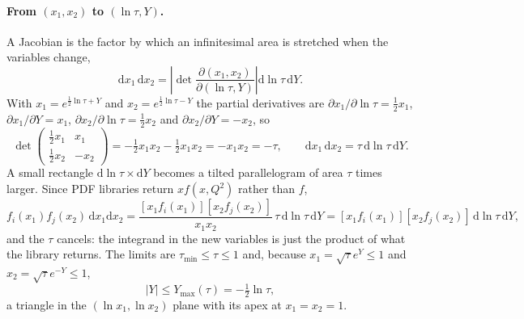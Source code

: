 \paragraph{From $(x_1,x_2)$ to $(\ln\tau,Y)$.} A Jacobian is the factor by
which an infinitesimal area is stretched when the variables change,
\begin{equation}
  \mathrm{d}x_1\,\mathrm{d}x_2=\left|\det\frac{\partial(x_1,x_2)}{\partial(\ln\tau,Y)}\right|\mathrm{d}\ln\tau\,\mathrm{d}Y .
\end{equation}
With $x_1=e^{\frac12\ln\tau+Y}$ and $x_2=e^{\frac12\ln\tau-Y}$ the partial
derivatives are $\partial x_1/\partial\ln\tau=\tfrac12x_1$,
$\partial x_1/\partial Y=x_1$, $\partial x_2/\partial\ln\tau=\tfrac12x_2$
and $\partial x_2/\partial Y=-x_2$, so
\begin{equation}
  \det\begin{pmatrix}\tfrac12x_1 & x_1\\ \tfrac12x_2 & -x_2\end{pmatrix}
  =-\tfrac12x_1x_2-\tfrac12x_1x_2=-x_1x_2=-\tau,
  \qquad
  \mathrm{d}x_1\,\mathrm{d}x_2=\tau\,\mathrm{d}\ln\tau\,\mathrm{d}Y .
  \label{eq:app:jacobian}
\end{equation}
A small rectangle $\mathrm{d}\ln\tau\times\mathrm{d}Y$ becomes a tilted
parallelogram of area $\tau$ times larger. Since PDF libraries return
$xf(x,Q^2)$ rather than $f$,
\begin{equation}
  f_i(x_1)f_j(x_2)\,\mathrm{d}x_1\mathrm{d}x_2
  =\frac{[x_1f_i(x_1)][x_2f_j(x_2)]}{x_1x_2}\,\tau\,\mathrm{d}\ln\tau\,\mathrm{d}Y
  =[x_1f_i(x_1)][x_2f_j(x_2)]\,\mathrm{d}\ln\tau\,\mathrm{d}Y,
  \label{eq:app:xf_cancel}
\end{equation}
and the $\tau$ cancels: the integrand in the new variables is just the
product of what the library returns. The limits are $\tau_{\min}\le\tau\le1$
and, because $x_1=\sqrt\tau e^{Y}\le1$ and $x_2=\sqrt\tau e^{-Y}\le1$,
\begin{equation}
  |Y|\le Y_{\max}(\tau)=-\tfrac12\ln\tau,
  \label{eq:app:ymax}
\end{equation}
a triangle in the $(\ln x_1,\ln x_2)$ plane with its apex at
$x_1=x_2=1$.

